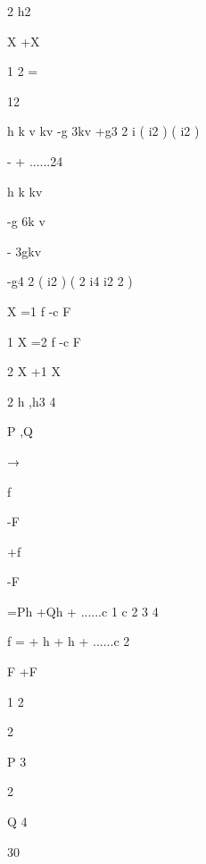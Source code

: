 2 h2\par
X  +X\par
1 2 =\par
12\par
h k v kv  -g 3kv  +g3 2 i ( i2 ) ( i2 )\par
-  + ......24\par
h k kv\par
-g 6k v\par
- 3gkv\par
-g4 2 ( i2 ) ( 2 i4 i2 2 )\par
X  =1 f  -c F\par
1 X  =2 f  -c F\par
2 X  +1 X\par
2 h ,h3 4\par
P ,Q\par
→\par
f\par
-F\par
+f\par
-F\par
=Ph +Qh + ......c 1 c 2 3 4\par
f  =  +  h +  h + ......c 2\par
F  +F\par
1 2\par
2\par
P 3\par
2\par
Q 4\par
30\par

